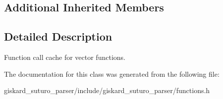 \subsection*{Additional Inherited Members}


\subsection{Detailed Description}
Function call cache for vector functions. 

The documentation for this class was generated from the following file\-:\begin{DoxyCompactItemize}
\item 
giskard\-\_\-suturo\-\_\-parser/include/giskard\-\_\-suturo\-\_\-parser/functions.\-h\end{DoxyCompactItemize}
